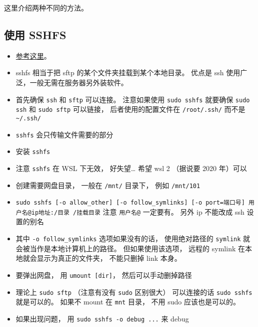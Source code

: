 
这里介绍两种不同的方法。

\subsection{使用 SSHFS}
\begin{itemize}
\item \href{https://www.digitalocean.com/community/tutorials/how-to-use-sshfs-to-mount-remote-file-systems-over-ssh}{参考这里}。
\item sshfs 相当于把 sftp 的某个文件夹挂载到某个本地目录。 优点是 ssh 使用广泛，一般无需在服务器另外装软件。
\item 首先确保 \verb`ssh` 和 \verb`sftp` 可以连接。 注意如果使用 \verb`sudo sshfs` 就要确保 \verb`sudo ssh` 和 \verb`sudo sftp` 可以链接， 后者使用的配置文件在 \verb`/root/.ssh/` 而不是 \verb`~/.ssh/`
\item \verb`sshfs` 会只传输文件需要的部分 %
\item 安装 \verb`sshfs`
\item 注意 \verb`sshfs` 在 WSL 下无效， 好失望… 希望 wsl 2 （据说要 2020 年）可以
\item 创建需要网盘目录， 一般在 \verb`/mnt/` 目录下， 例如 \verb`/mnt/101`
\item \verb`sudo sshfs [-o allow_other] [-o follow_symlinks] [-o port=端口号] 用户名@ip地址:/目录 /挂载目录` 注意 \verb`用户名@` 一定要有。 另外 ip 不能改成 ssh 设置的别名
\item 其中 \verb`-o follow_symlinks` 选项如果没有的话， 使用绝对路径的 \verb`symlink` 就会被当作是本地计算机上的路径。 但如果使用该选项， 远程的 symlink 在本地就会显示为真正的文件夹， 不能只删掉 link 本身。
\item 要弹出网盘， 用 \verb`umount [dir]`， 然后可以手动删掉路径
\item 理论上 \verb`sudo sftp` （注意有没有 \verb`sudo` 区别很大） 可以连接的话 \verb`sudo sshfs` 就是可以的。 如果不 mount 在 \verb`mnt` 目录， 不用 sudo 应该也是可以的。
\item 如果出现问题， 用 \verb`sudo sshfs -o debug ...` 来 debug
\end{itemize}

